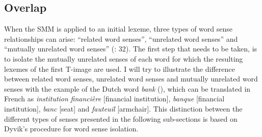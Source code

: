 \subsection{\label{sec:3.4.3}  Overlap}

When the SMM is applied to an initial lexeme, three types of word sense relationships can arise: “related word senses”, “unrelated word senses” and “mutually unrelated word senses” (\citealt{langemets_translations_2005}: 32). The first step that needs to be taken, is to isolate the mutually unrelated senses of each word \citep[32]{langemets_translations_2005} for which the resulting lexemes of the first T-image are used. I will try to illustrate the difference between related word senses, unrelated word senses and mutually unrelated word senses with the example of the Dutch word \textit{bank} (), which can be translated in French as \textit{institution} \textit{financière} [financial institution], \textit{banque} [financial institution], \textit{banc} [seat] and \textit{fauteuil} [armchair]. This distinction between the different types of senses presented in the following sub-sections is based on Dyvik’s procedure for word sense isolation.


